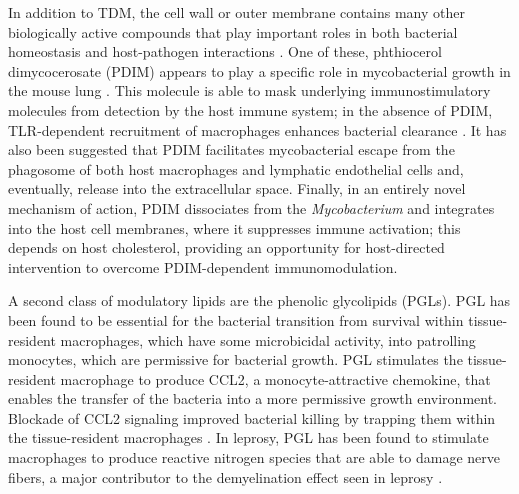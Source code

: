 In addition to TDM, the cell wall or outer membrane contains many other biologically active compounds that play important roles in both bacterial homeostasis and host-pathogen interactions \citep{Yu2012}. One of these, phthiocerol dimycocerosate (PDIM) appears to play a specific role in mycobacterial growth in the mouse lung \citep{Cox1999}. This molecule is able to mask underlying immunostimulatory molecules from detection by the host immune system; in the absence of PDIM, TLR-dependent recruitment of macrophages enhances bacterial clearance \citep{Cambier2014, Day2014}. It has also been suggested that PDIM facilitates mycobacterial escape from the phagosome of both host macrophages and lymphatic endothelial cells and, eventually, release into the extracellular space\citep{Quigley2017, Lerner2018}. Finally, in an entirely novel mechanism of action, PDIM dissociates from the \textit{Mycobacterium} and integrates into the host cell membranes, where it suppresses immune activation; this depends on host cholesterol, providing an opportunity for host-directed intervention to overcome PDIM-dependent immunomodulation.

A second class of modulatory lipids are the phenolic glycolipids (PGLs). PGL has been found to be essential for the bacterial transition from survival within tissue-resident macrophages, which have some microbicidal activity, into patrolling monocytes, which are permissive for bacterial growth. PGL stimulates the tissue-resident macrophage to produce CCL2, a monocyte-attractive chemokine, that enables the transfer of the bacteria into a more permissive growth environment. Blockade of CCL2 signaling improved bacterial killing by trapping them within the tissue-resident macrophages \cite{Cambier2014, Cambier2017}. In leprosy, PGL has been found to stimulate macrophages to produce reactive nitrogen species that are able to damage nerve fibers, a major contributor to the demyelination effect seen in leprosy \cite{Madigan2017}.

